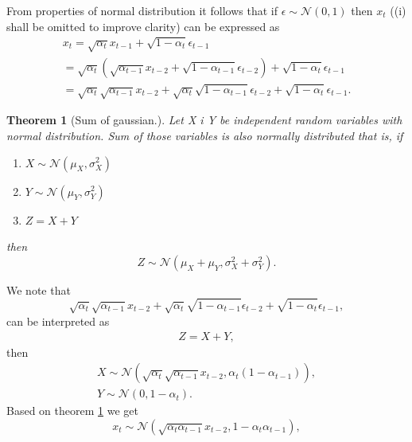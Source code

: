 \documentclass[10pt]{article}
\newtheorem{Twierdzenie}{Theorem}[section]
\begin{document}
 From properties of normal distribution it follows that if $ \epsilon \sim  \mathcal{N}(0, 1) $  then $x_{t}$ ((i) shall be omitted to improve clarity) can be expressed as
\begin{gather} \label{eq:rec_proof_start}
    x_{t} =  \sqrt{  \alpha_{t} } x_{t-1}  + \sqrt{ 1 - \alpha_{t}}\epsilon_{t-1} \\
    = 
     \label{eq:rec_proof}
    \sqrt{  \alpha_{t} } (\sqrt{  \alpha_{t-1} } x_{t-2}  + \sqrt{ 1 - \alpha_{t-1}}\epsilon_{t-2}) 
    + \sqrt{ 1 - \alpha_{t}}\epsilon_{t-1} \\
    = \sqrt{  \alpha_{t} } \sqrt{  \alpha_{t-1} } x_{t-2} + 
        \sqrt{  \alpha_{t} } \sqrt{ 1 - \alpha_{t-1}}\epsilon_{t-2}
         + \sqrt{ 1 - \alpha_{t}}\epsilon_{t-1}.
\end{gather}
\begin{Twierdzenie}[Sum of gaussian.]\label{gaussian_sum_dist}
Let X i Y be independent random variables with normal distribution. Sum of those variables is also normally distributed that is, if
\begin{enumerate}
   \item   $X \sim \mathcal{N}( \mu_{X}, \sigma_{X}^{2})$
    \item  $Y \sim \mathcal{N}( \mu_{Y}, \sigma_{Y}^{2})$
    \item   $Z = X + Y$
\end{enumerate}
then
\begin{displaymath}
   Z \sim \mathcal{N}( \mu_{X} +\mu_{Y} , \sigma_{X}^{2} + \sigma_{Y}^{2} ).
\end{displaymath}

\end{Twierdzenie}
We note that
\begin{equation}
    \sqrt{  \alpha_{t} } \sqrt{  \alpha_{t-1} } x_{t-2} + 
        \sqrt{  \alpha_{t} } \sqrt{ 1 - \alpha_{t-1}}\epsilon_{t-2}
         + \sqrt{ 1 - \alpha_{t}}\epsilon_{t-1},
\end{equation}
can be interpreted as
\begin{gather}
      Z = X + Y,
\end{gather}
then
\begin{gather}
    X \sim \mathcal{N}( \sqrt{  \alpha_{t} } \sqrt{  \alpha_{t-1} } x_{t-2},  \alpha_{t}( 1 - \alpha_{t-1}) ), \\
    Y \sim \mathcal{N}(0 ,  1 - \alpha_{t}).
\end{gather}
Based on theorem \ref{gaussian_sum_dist} we get 
\begin{equation}
     x_{t} \sim \mathcal{N}( \sqrt{  \alpha_{t} \alpha_{t-1} } x_{t-2}, 1 - \alpha_{t}\alpha_{t-1} ),
\end{equation}
\end{document}
